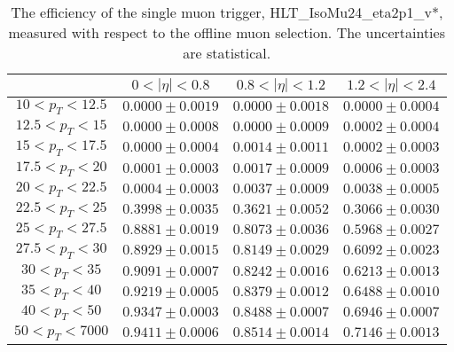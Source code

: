 \begin{table}[!ht]
\begin{center}
\begin{tabular}{c|c|c|c}
\hline & $0 < |\eta| < 0.8$ & $0.8 < |\eta| < 1.2$ & $1.2 < |\eta| < 2.4$  \\
\hline
$ 10 < p_T < 12.5$ & $0.0000 \pm 0.0019$ & $0.0000 \pm 0.0018$ & $0.0000 \pm 0.0004$  \\
$12.5 < p_T <  15$ & $0.0000 \pm 0.0008$ & $0.0000 \pm 0.0009$ & $0.0002 \pm 0.0004$  \\
$ 15 < p_T < 17.5$ & $0.0000 \pm 0.0004$ & $0.0014 \pm 0.0011$ & $0.0002 \pm 0.0003$  \\
$17.5 < p_T <  20$ & $0.0001 \pm 0.0003$ & $0.0017 \pm 0.0009$ & $0.0006 \pm 0.0003$  \\
$ 20 < p_T < 22.5$ & $0.0004 \pm 0.0003$ & $0.0037 \pm 0.0009$ & $0.0038 \pm 0.0005$  \\
$22.5 < p_T <  25$ & $0.3998 \pm 0.0035$ & $0.3621 \pm 0.0052$ & $0.3066 \pm 0.0030$  \\
$ 25 < p_T < 27.5$ & $0.8881 \pm 0.0019$ & $0.8073 \pm 0.0036$ & $0.5968 \pm 0.0027$  \\
$27.5 < p_T <  30$ & $0.8929 \pm 0.0015$ & $0.8149 \pm 0.0029$ & $0.6092 \pm 0.0023$  \\
$ 30 < p_T <  35$ & $0.9091 \pm 0.0007$ & $0.8242 \pm 0.0016$ & $0.6213 \pm 0.0013$  \\
$ 35 < p_T <  40$ & $0.9219 \pm 0.0005$ & $0.8379 \pm 0.0012$ & $0.6488 \pm 0.0010$  \\
$ 40 < p_T <  50$ & $0.9347 \pm 0.0003$ & $0.8488 \pm 0.0007$ & $0.6946 \pm 0.0007$  \\
$ 50 < p_T < 7000$ & $0.9411 \pm 0.0006$ & $0.8514 \pm 0.0014$ & $0.7146 \pm 0.0013$  \\
\hline
\end{tabular}
\caption{The efficiency of the single muon trigger,
HLT\_IsoMu24\_eta2p1\_v*,
measured with respect to the offline muon selection. 
The uncertainties are statistical.}
\label{tab:eff_muon_sgl}
\end{center}
\end{table}


